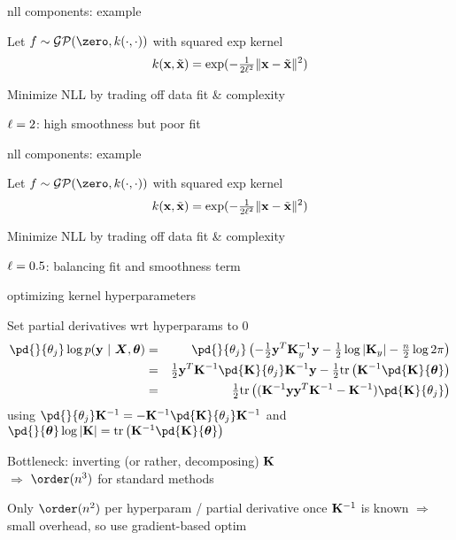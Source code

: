 \documentclass[11pt,compress,t,notes=noshow, xcolor=table]{beamer}
\begin{document}
\begin{framei}[sep=L]{nll components: example}
\item Let $f \sim \mathcal{GP}(\zero, k(\cdot, \cdot))$ with squared exp kernel $$k(\mathbf{x}, \tilde{\mathbf{x}}) = \exp(-\tfrac{1}{2 \ell^2} \| \mathbf{x} - \tilde{\mathbf{x}} \|^2)$$
\item Minimize NLL by trading off data fit \& complexity
\item $\ell = 2$: high smoothness but poor fit
\vfill
{}
\end{framei}

\begin{framei}[sep=L]{nll components: example}
\item Let $f \sim \mathcal{GP}(\zero, k(\cdot, \cdot))$ with squared exp kernel $$k(\mathbf{x}, \tilde{\mathbf{x}}) = \exp(-\tfrac{1}{2 \ell^2} \| \mathbf{x} - \tilde{\mathbf{x}} \|^2)$$
\item Minimize NLL by trading off data fit \& complexity
\item $\ell = 0.5$: balancing fit and smoothness term
\vfill
{}
\end{framei}


\begin{framei}[sep=L]{optimizing kernel hyperparameters}
\item Set partial derivatives wrt hyperparams to 0
\begin{eqnarray*}
\pd{}{\theta_j}
\log p(\yv ~|~ \bm{X}, \thetav) &=& \pd{}{\theta_j}  \left(-\tfrac{1}{2}\yv^T\Kmat_y^{-1} \yv - \tfrac{1}{2} \log \left| \Kmat_y \right| - \tfrac{n}{2} \log 2\pi\right) \\ 
&=&\tfrac{1}{2} \yv^T \Kmat^{-1} \pd{\Kmat}{\theta_j}\Kmat^{-1} \yv - \tfrac{1}{2} \text{tr}\left(\Kmat^{-1} \pd{\Kmat}{ \thetav} \right) \\
&=& \tfrac{1}{2} \text{tr}\left((\Kmat^{-1}\yv\yv^T\Kmat^{-1} - \Kmat^{-1})\pd{\Kmat}{\theta_j}\right)
\end{eqnarray*}
using $\pd{}{\theta_j} \Kmat^{-1} = - \Kmat^{-1}  \pd{\Kmat}{\theta_j}\Kmat^{-1}$ and $\pd{}{\thetav} \log  |\Kmat| = \text{tr}\left(\Kmat^{-1} \pd{\Kmat}{\thetav} \right)$
\item Bottleneck: inverting (or rather, decomposing) $\mathbf{K}$ \\$\Rightarrow$ $\order(n^3)$ for standard methods
\item Only $\order(n^2)$ per hyperparam / partial derivative once $\mathbf{K}^{-1}$ is known $\Rightarrow$ small overhead, so use gradient-based optim 
\end{framei}
\end{document}

